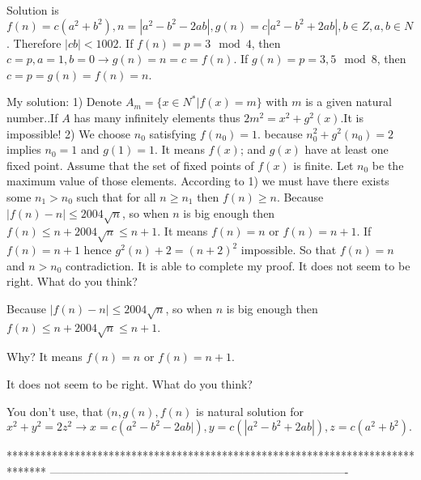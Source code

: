 \begin{solution}
	\begin{tcolorbox}Solution is
$ f(n) = c(a^2 + b^2),n = |a^2 - b^2 - 2ab|,g(n) = c|a^2 - b^2 + 2ab|, b\in Z, a,b\in N$.
Therefore $ |cb| < 1002$. If $ f(n) = p = 3\mod 4$, then $ c = p,a = 1,b = 0\to g(n) = n = c = f(n)$.
If $ g(n) = p = 3,5\mod 8$, then $ c = p = g(n) = f(n) = n$.\end{tcolorbox}
 
\end{solution}



\begin{solution}
	My solution:
1) Denote $ A_m = \{x\in N^*|f(x) = m\}$ with $ m$ is a given natural number..If $ A$ has many infinitely elements thus $ 2m^2 = x^2 + g^2(x)$.It is impossible!
2) We choose $ n_0$ satisfying $ f(n_0) = 1$. because $ n_0^2 + g^2(n_0) = 2$ implies $ n_0 = 1$ and $ g(1) = 1$. It means $ f(x)$; and $ g(x)$ have at least one fixed point.
Assume that the set of fixed points of $ f(x)$ is finite. Let $ n_0$ be the maximum value of those elements.
According to 1) we must have there exists some $ n_1 > n_0$ such that for all $ n\ge n_1$ then $ f(n)\ge n$.
Because $ |f(n) - n|\le 2004\sqrt n$, so when $ n$ is big enough then $ f(n)\le n + 2004\sqrt n\le n + 1$.
It means $ f(n) = n$ or $ f(n) = n + 1$.
If $ f(n) = n + 1$ hence $ g^2(n) + 2 = (n + 2)^2$ impossible.
So that $ f(n) = n$ and $ n > n_0$ contradiction. It is able to complete my proof.
It  does not seem to be right. What do you think?
\end{solution}



\begin{solution}
	\begin{tcolorbox}Because $ |f(n) - n|\le 2004\sqrt n$, so when $ n$ is big enough then $ f(n)\le n + 2004\sqrt n\le n + 1$.\end{tcolorbox}
Why?
It means $ f(n) = n$ or $ f(n) = n + 1$.
\begin{tcolorbox}It  does not seem to be right. What do you think?\end{tcolorbox}
You don't use, that $ (n,g(n),f(n)$ is natural solution for $ x^2+y^2=2z^2\to x=c(a^2-b^2-2ab|),y=c(|a^2-b^2+2ab|),z=c(a^2+b^2).$
\end{solution}
*******************************************************************************
-------------------------------------------------------------------------------

